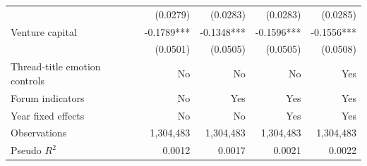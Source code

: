 \documentclass[11pt]{article}
\begin{document}
\begin{table}[H]
{\begin{tabular}{lrrrr}
         & (0.0279) & (0.0283) & (0.0283) & (0.0285) \\
        Venture capital & -0.1789*** & -0.1348*** & -0.1596*** & -0.1556*** \\
         & (0.0501) & (0.0505) & (0.0505) & (0.0508) \\
        \midrule
        Thread-title emotion controls & No & No & No & Yes \\
        Forum indicators & No & Yes & Yes & Yes \\
        Year fixed effects & No & No & Yes & Yes \\
        Observations & 1,304,483 & 1,304,483 & 1,304,483 & 1,304,483 \\
        Pseudo $R^2$ & 0.0012 & 0.0017 & 0.0021 & 0.0022 \\
        \bottomrule
    \end{tabular}}
\end{table}
\end{document}
